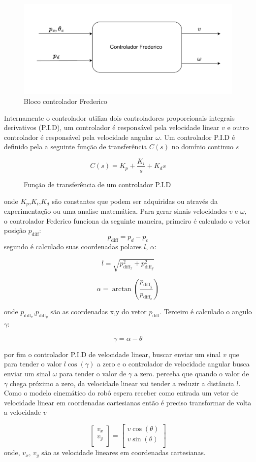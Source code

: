 \begin{figure}[H]
    \centering
    \includegraphics[scale=0.8]{figuras/controlador_frederico.pdf}
    \caption{Bloco controlador Frederico}
\end{figure}

Internamente o controlador utiliza  dois controladores proporcionais
integrais derivativos (P.I.D), um controlador é responsável pela velocidade linear $v$
e outro controlador é responsável pela velocidade angular $\omega$. 
Um controlador P.I.D é definido pela a seguinte função de
transferência $C(s)$ no domínio continuo $s$

\begin{figure}[H]
    \[
        C(s) = K_p + \frac{K_i}{s} + K_ds
    \]
    \caption{Função de transferência de um controlador P.I.D }
\end{figure}
onde $K_p$,$K_i$,$K_d$ são constantes que podem ser adquiridas ou
através da experimentação ou uma analise matemática. Para gerar sinais
velocidades $v$ e $\omega$,  o controlador Federico funciona da seguinte
maneira, primeiro é calculado o vetor posição $p_{\text{diff}}$:
\[
    p_{\text{diff}} = p_d - p_c 
\]
segundo é calculado suas coordenadas polares $l$, $\alpha$:

\[
    l = \sqrt{p_{\text{diff}_x}^2 + p_{\text{diff}_y}^2}
\]

\[
    \alpha =  \arctan(\frac{ p_{\text{diff}_y}}{p_{\text{diff}_x}}) 
\]

onde $p_{\text{diff}_x}$,$p_{\text{diff}_y}$ são as coordenadas x,y
do vetor $p_{\text{diff}}$. Terceiro é calculado o angulo $\gamma$:

\[
    \gamma =  \alpha - \theta
\]


por fim o controlador P.I.D de velocidade
linear, buscar enviar um sinal $v$ que para tender o valor $l \cos(\gamma)$
a zero e o controlador de velocidade angular busca enviar um sinal $\omega$
para  tender o valor de $\gamma$ a zero. perceba que quando o valor de $\gamma$
chega próximo a zero, da velocidade linear vai tender a reduzir a
distância $l$. Como o modelo cinemático do robô espera receber como entrada
um vetor de velocidade linear em coordenadas cartesianas então é preciso
transformar de volta a velocidade $v$ 

\[
    \begin{bmatrix}
        v_x \\
        v_y \\
    \end{bmatrix}
    =
    \begin{bmatrix}
        v\cos(\theta) \\
        v\sin(\theta) \\
    \end{bmatrix}
\]
onde, $v_x$, $v_y$ são as velocidade lineares em coordenadas cartesianas.